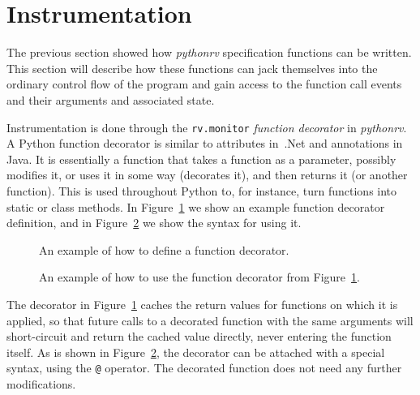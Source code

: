 \section{Instrumentation} \label{section-approach-instrumentation}

The previous section showed how \textit{pythonrv} specification functions can
be written. This section will describe how these functions can jack themselves
into the ordinary control flow of the program and gain access to the function
call events and their arguments and associated state.

Instrumentation is done through the \texttt{rv.monitor} \textit{function
decorator} in \textit{pythonrv}. A Python function decorator is similar to
attributes in~.Net and annotations in Java. It is essentially a function that
takes a function as a parameter, possibly modifies it, or uses it in some way
(decorates it), and then returns it (or another function). This is used
throughout Python to, for instance, turn functions into static or class
methods. In Figure~\ref{figure-function-decorator} we show an example function
decorator definition, and in Figure~\ref{figure-function-decorator-usages} we
show the syntax for using it.

\begin{figure}[h!]
	\begin{center}
	\begin{minipage}{0.7\textwidth}
	
	\end{minipage}
	\end{center}

	\caption{An example of how to define a function decorator.}
	\label{figure-function-decorator}
\end{figure}

\begin{figure}[h!]
	\begin{center}
	\begin{minipage}{0.7\textwidth}
	
	\end{minipage}
	\end{center}

	\caption{An example of how to use the function decorator from
	Figure~\ref{figure-function-decorator}.}
	\label{figure-function-decorator-usages}
\end{figure}

The decorator in Figure~\ref{figure-function-decorator} caches the return
values for functions on which it is applied, so that future calls to a
decorated function with the same arguments will short-circuit and return the
cached value directly, never entering the function itself. As is shown in
Figure~\ref{figure-function-decorator-usages}, the decorator can be attached
with a special syntax, using the \texttt{@} operator. The decorated function
does not need any further modifications.


